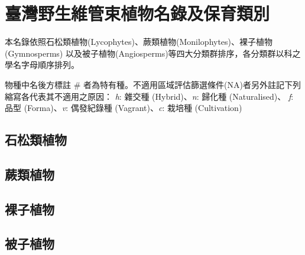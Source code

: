 \chapter{臺灣野生維管束植物名錄及保育類別}

\begin{small}
\linespread{1.5}\selectfont
本名錄依照石松類植物(Lycophytes)、蕨類植物(Monilophytes)、裸子植物(Gymnosperms)
以及被子植物(Angiosperms)等四大分類群排序，各分類群以科之學名字母順序排列。

\noindent 物種中名後方標註 \# 者為特有種。不適用區域評估篩選條件(NA)者另外註記下列縮寫各代表其不適用之原因：
\textit{h}: 雜交種 (Hybrid)、\textit{n}: 歸化種 (Naturalised)、
\textit{f}: 品型 (Forma)、\textit{v}: 偶發紀錄種 (Vagrant)、\textit{c}: 栽培種 (Cultivation) \\
\end{small}

\begin{multicols}{2}
\linespread{1}\selectfont
\section{石松類植物}

\section{蕨類植物}

\section{裸子植物}

\section{被子植物}

\end{multicols}
